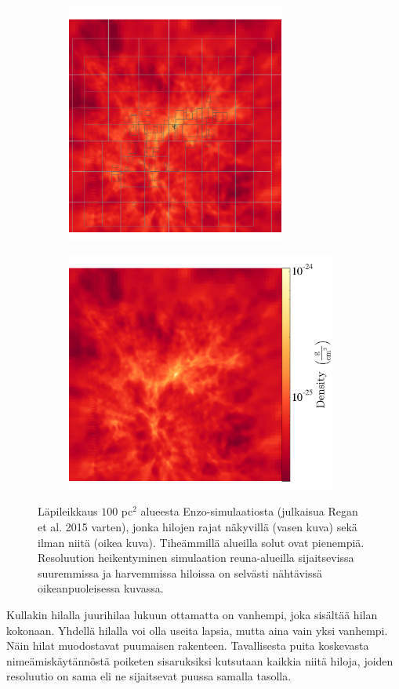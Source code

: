 \documentclass[12pt,a4paper]{article}
\begin{document}
\begin{figure}
   \centering
   \begin{subfigure}[b]{0.45\textwidth}
       \includegraphics[height=7.9cm]{../kuvat/amr-grid.png}
   \end{subfigure}
   \begin{subfigure}[b]{0.45\textwidth}
       \includegraphics[height=7.9cm]{../kuvat/amr-nogrid.png}
   \end{subfigure}
   \caption{Läpileikkaus $100$ pc$^2$ alueesta Enzo-simulaatiosta (julkaisua Regan et al. 2015 varten), jonka hilojen rajat näkyvillä (vasen kuva) sekä ilman niitä (oikea kuva). Tiheämmillä alueilla solut ovat pienempiä. Resoluution heikentyminen simulaation reuna-alueilla sijaitsevissa suuremmissa ja harvemmissa hiloissa on selvästi nähtävissä oikeanpuoleisessa kuvassa.}\label{fig:enzogrid} %
\end{figure}
	
Kullakin hilalla juurihilaa lukuun ottamatta on vanhempi, joka sisältää hilan kokonaan. Yhdellä hilalla voi olla useita lapsia, mutta aina vain yksi vanhempi. Näin hilat muodostavat puumaisen rakenteen. Tavallisesta puita koskevasta nimeämiskäytännöstä poiketen sisaruksiksi kutsutaan kaikkia niitä hiloja, joiden resoluutio on sama eli ne sijaitsevat puussa samalla tasolla. \cite{enzo}
	
\end{document}
